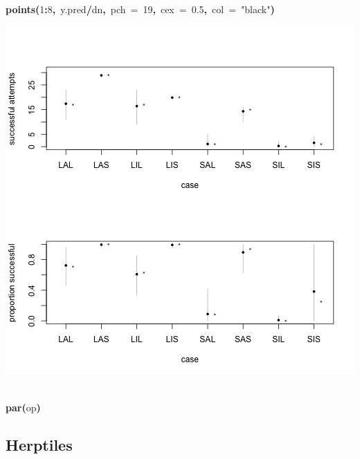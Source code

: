 \documentclass{article}
\makeatletter
\newcommand{\hlnumber}[1]{\textcolor[rgb]{0,0,0}{#1}}%
\newcommand{\hlfunctioncall}[1]{\textcolor[rgb]{.5,0,.33}{\textbf{#1}}}%
\newcommand{\hlstring}[1]{\textcolor[rgb]{.6,.6,1}{#1}}%
\newcommand{\hlkeyword}[1]{\textbf{#1}}%
\newcommand{\hlargument}[1]{\textcolor[rgb]{.69,.25,.02}{#1}}%
\newcommand{\hlsymbol}[1]{#1}%
\newcommand{\hlstd}[1]{\textcolor[rgb]{0,0,0}{#1}}%
\newenvironment{kframe}{%
 \def\FrameCommand##1{\hskip\@totalleftmargin \hskip-\fboxsep
 \colorbox{shadecolor}{##1}\hskip-\fboxsep
     \hskip-\linewidth \hskip-\@totalleftmargin \hskip\columnwidth}%
 \MakeFramed {\advance\hsize-\width
   \@totalleftmargin\z@ \linewidth\hsize
   \@setminipage}}%
 {\par\unskip\endMakeFramed}
\newenvironment{knitrout}{}{} %
\makeatother
\begin{document}
\begin{knitrout}
{\begin{kframe}
\begin{flushleft}
\hlstd{}\hlfunctioncall{points}\hlkeyword{(}\hlnumber{1}\hlkeyword{:}\hlnumber{8}\hlkeyword{,}{\ }\hlsymbol{y.pred}\hlkeyword{/}\hlsymbol{d}\hlkeyword{\usebox{\hlnormalsizeboxdollar}}\hlsymbol{n}\hlkeyword{,}{\ }\hlargument{pch}{\ }\hlargument{=}{\ }\hlnumber{19}\hlkeyword{,}{\ }\hlargument{cex}{\ }\hlargument{=}{\ }\hlnumber{0.5}\hlkeyword{,}{\ }\hlargument{col}{\ }\hlargument{=}{\ }\hlstring{"black"}\hlkeyword{)}\mbox{}
\normalfont
\end{flushleft}
\includegraphics{better-model-fig} \begin{flushleft}
\ttfamily\noindent
\hspace*{\fill}\\
\hlstd{}\hlfunctioncall{par}\hlkeyword{(}\hlsymbol{op}\hlkeyword{)}\mbox{}
\normalfont
\end{flushleft}
\end{kframe}}
\end{knitrout}


\subsection*{Herptiles}
\end{document}
